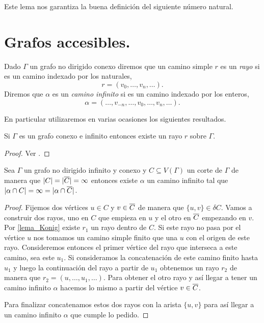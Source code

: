 \documentclass[tesis.tex]{subfiles}
\begin{document}
Este lema nos garantiza la buena definición del siguiente número natural.




\section{Grafos accesibles.}

\begin{deff}
	Dado $\Gamma$ un grafo no dirigido conexo diremos que un camino simple $r$ es un \emph{rayo} si es un camino indexado por los naturales,
	\[
	r = (v_0, \dots, v_{n}, \dots).
	\]	
	Diremos que $\alpha$ es un \emph{camino infinito} si es un camino indexado por los enteros,
	\[
	\alpha = ( \dots, v_{-n}, \dots, v_0, \dots, v_{n}, \dots ).
	\]
\end{deff}		


En particular utilizaremos en varias ocasiones los siguientes resultados.


\begin{lema}[König]\label{lema_Konig}
	Si $\Gamma$ es un grafo conexo e infinito entonces existe un rayo $r$ sobre $\Gamma$.
\end{lema}
\begin{proof}
	Ver \cite[p.215]{diestel2005graph}.
\end{proof}


\begin{lema}\label{lema_camino_infinito_cortado}
	Sea $\Gamma$ un grafo no dirigido infinito y conexo y $C \subseteq V(\Gamma)$ un corte de $\Gamma$ de manera que $|C| = |\overline C| = \infty$ entonces existe $\alpha$ un camino infinito tal que 
	$|\alpha \cap C| = \infty = |\alpha \cap \overline C|$.
\end{lema}

\begin{proof}
	Fijemos dos vértices $u \in C$ y $v \in \overline C$ de manera que $\{u,v\} \in \delta C$.
	Vamos a construir dos rayos, uno en $C$ que empieza en $u$ y el otro en $\overline C$ empezando en $v$.
	Por \ref{lema_Konig} existe $r_{1}$ un rayo dentro de $C$.
	Si este rayo no pasa por el vértice $u$ nos tomamos un camino simple finito que una $u$ con el origen de este rayo.
	Consideremos entonces el primer vértice del rayo que interseca a este camino, sea este $u_{1}$.
	Si consideramos la concatenación de este camino finito hasta $u_{1}$ y luego la continuación del rayo a partir de $u_{1}$ obtenemos 
	un rayo $r_{2}$ de manera que $r_{2} = (u, \dots, u_{1}, \dots)$.
	Para obtener el otro rayo y así llegar a tener un camino infinito $\alpha$ hacemos lo mismo a partir del vértice $v \in \overline C$. 
	
	Para finalizar concatenamos estos dos rayos con la arista $\{u,v\}$ para así llegar a un camino infinito $\alpha$ que cumple lo pedido. 
	
\end{proof}
\end{document}
